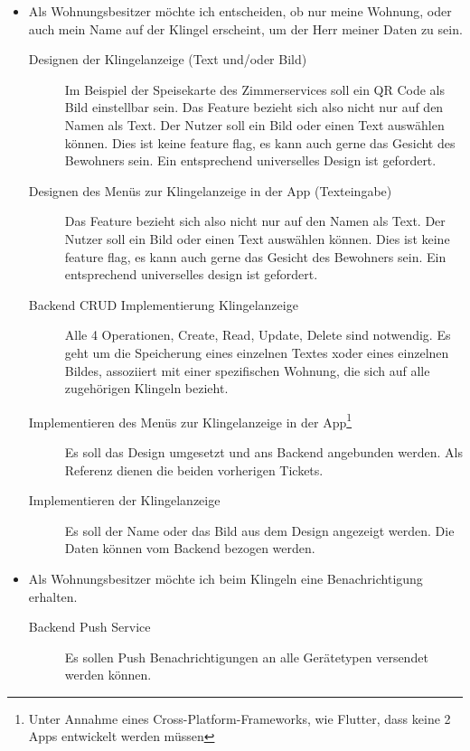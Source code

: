 \begin{itemize}
    \item Als Wohnungsbesitzer möchte ich entscheiden, ob nur meine Wohnung, oder auch mein Name auf der Klingel erscheint, um der Herr meiner Daten zu sein.
        \begin{description}
            \item[Designen der Klingelanzeige (Text und/oder Bild)] Im Beispiel der Speisekarte des Zimmerservices soll ein QR Code als Bild einstellbar sein.
                Das Feature bezieht sich also nicht nur auf den Namen als Text.
                Der Nutzer soll ein Bild oder einen Text auswählen können.
                Dies ist keine feature flag, es kann auch gerne das Gesicht des Bewohners sein.
                Ein entsprechend universelles Design ist gefordert.
            \item[Designen des Menüs zur Klingelanzeige in der App (Texteingabe)]
                Das Feature bezieht sich also nicht nur auf den Namen als Text.
                Der Nutzer soll ein Bild oder einen Text auswählen können.
                Dies ist keine feature flag, es kann auch gerne das Gesicht des Bewohners sein.
                Ein entsprechend universelles design ist gefordert.
            \item[Backend CRUD Implementierung Klingelanzeige]
                Alle 4 Operationen, Create, Read, Update, Delete sind notwendig.
                Es geht um die Speicherung eines einzelnen Textes xoder eines einzelnen Bildes, assoziiert mit einer spezifischen Wohnung, die sich auf alle zugehörigen Klingeln bezieht.
            \item[Implementieren des Menüs zur Klingelanzeige in der App\footnote{Unter Annahme eines Cross-Platform-Frameworks, wie Flutter, dass keine 2 Apps entwickelt werden müssen}]
                Es soll das Design umgesetzt und ans Backend angebunden werden.
                Als Referenz dienen die beiden vorherigen Tickets.
            \item[Implementieren der Klingelanzeige]
                Es soll der Name oder das Bild aus dem Design angezeigt werden.
                Die Daten können vom Backend bezogen werden.
        \end{description}
    \item Als Wohnungsbesitzer möchte ich beim Klingeln eine Benachrichtigung erhalten.
        \begin{description}
            \item[Backend Push Service] Es sollen Push Benachrichtigungen an alle Gerätetypen versendet werden können.

\end{description}
\end{itemize}
